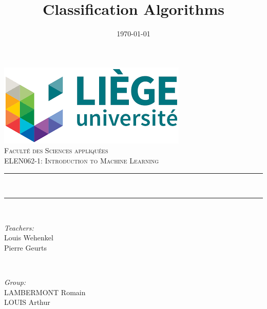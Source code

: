 \documentclass[12pt]{article}
\title{Classification Algorithms}							%
\date{\today}											%
\makeatletter
\let\thetitle\@title
\let\thedate\@date
\makeatother
\begin{document}

\begin{titlepage}
	\centering
    \includegraphics[scale = 0.7]{img/University.png}\\[1.0 cm]	%
    \textsc{\LARGE \newline\newline Faculté des Sciences appliquées}\\	%
	\textsc{\Large  ELEN062-1: Introduction to Machine Learning}\\[0.5 cm]	%
	\rule{\linewidth}{0.2 mm} \\[0.4 cm]
	{\huge \bfseries \thetitle}
	\rule{\linewidth}{0.2 mm} \\[2 cm]
	
	\begin{minipage}{0.5\textwidth}
		\begin{flushleft} \large
			\emph{Teachers:}\\
			Louis Wehenkel\\
			 Pierre Geurts\\
			\end{flushleft}
			\end{minipage}~
			\begin{minipage}{0.4\textwidth}
            
			\begin{flushright} \large
			\emph{Group:} \\
			LAMBERMONT Romain\\
            LOUIS Arthur\\
		\end{flushright}
        
	\end{minipage}\\[5 cm]
	
	
    \thedate
	
\end{titlepage}

\thispagestyle{empty}
\pagebreak
\setcounter{page}{1}
\end{document}
